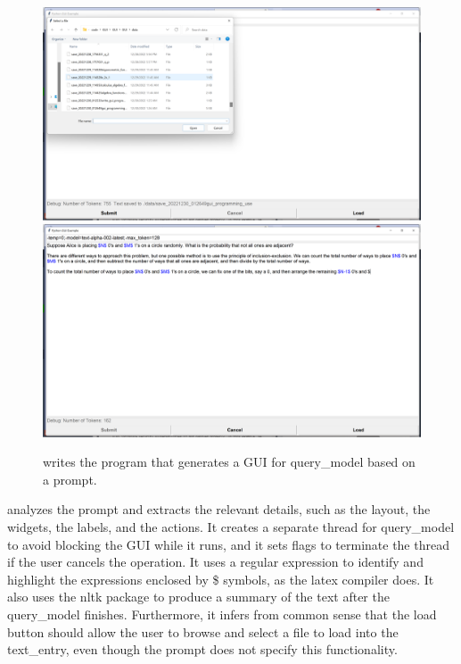 \begin{figure}[H]
\begin{AIbox}{\DV}

\includegraphics[width=0.45\linewidth]{figures/s1.png} \hfill \includegraphics[width=0.45\linewidth]{figures/s2.png}
\end{AIbox}
\caption{\DV writes the program that generates a GUI for query\_model based on a prompt.}
\end{figure}
\DV analyzes the prompt and extracts the relevant details, such as the layout, the widgets, the labels, and the actions. It creates a separate thread for query\_model to avoid blocking the GUI while it runs, and it sets flags to terminate the thread if the user cancels the operation. It uses a regular expression to identify and highlight the expressions enclosed by \$ symbols, as the latex compiler does. It also uses the nltk package to produce a summary of the text after the query\_model finishes. Furthermore, it infers from common sense that the load button should allow the user to browse and select a file to load into the text\_entry, even though the prompt does not specify this functionality.





